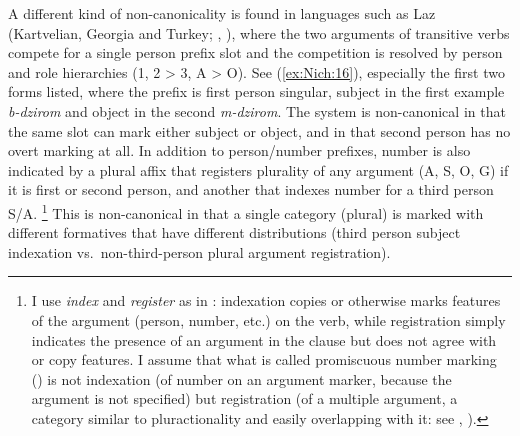 \documentclass[output=collectionpaper]{langsci/langscibook}
\begin{document}
A different kind of non-canonicality is found in languages such as Laz (Kart\-ve\-lian, Georgia and Turkey; \citealt[283]{Lacroix2009}, \citealt[48]{Oeztuerk2011}), where the two arguments of transitive verbs compete for a single person prefix slot and the competition is resolved by person and role hierarchies (1, 2 > 3, A > O). See (\ref{ex:Nich:16}), especially the first two forms listed, where the prefix is first person singular, subject in the first example \textit{b-dzirom} and object in the second \textit{m-dzirom}. The system is non-canonical in that the same slot can mark either subject or object, and in that second person has no overt marking at all. In addition to person/number prefixes, number is also indicated by a plural affix that registers plurality of any argument (A, S, O, G) if it is first or second person, and another that indexes number for a third person S/A.%
\footnote{%
I use \textit{index} and \textit{register} as in \citet[48--49]{Nichols1992}: indexation copies or otherwise marks features of the argument (person, number, etc.\@) on the verb, while registration simply indicates the presence of an argument in the clause but does not agree with or copy features. I assume that what is called promiscuous number marking (\citealt{Leer1991}) is not indexation (of number on an argument marker, because the argument is not specified) but registration (of a multiple argument, a category similar to pluractionality and easily overlapping with it: see \citealt{Wood2007}, \citealt{Yu2003}).
} %
This is non-canonical in that a single category (plural) is marked with different formatives that have different distributions (third person subject indexation vs.\ non-third-person plural argument registration).

%
\end{document}
